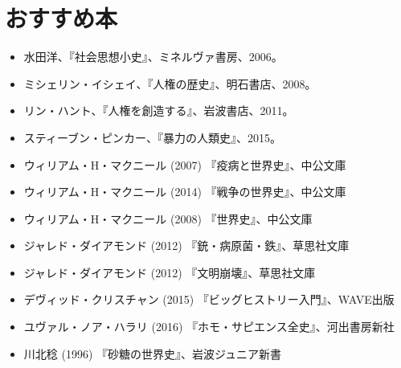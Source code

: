 \documentclass[autodetect-engine,dvipdfmx-if-dvi,ja=standard]{bxjsarticle} \usepackage{mystyle}
\begin{document}
\section*{おすすめ本}
\begin{itemize}
\item 水田洋、『社会思想小史』、ミネルヴァ書房、2006。
\item ミシェリン・イシェイ、『人権の歴史』、明石書店、2008。
\item リン・ハント、『人権を創造する』、岩波書店、2011。
\item スティーブン・ピンカー、『暴力の人類史』、2015。
\item ウィリアム・H・マクニール (2007) 『疫病と世界史』、中公文庫
\item ウィリアム・H・マクニール (2014) 『戦争の世界史』、中公文庫
\item   ウィリアム・H・マクニール (2008) 『世界史』、中公文庫
\item ジャレド・ダイアモンド (2012) 『銃・病原菌・鉄』、草思社文庫
\item ジャレド・ダイアモンド (2012) 『文明崩壊』、草思社文庫
\item デヴィッド・クリスチャン (2015) 『ビッグヒストリー入門』、WAVE出版
\item ユヴァル・ノア・ハラリ (2016) 『ホモ・サピエンス全史』、河出書房新社
\item 川北稔 (1996) 『砂糖の世界史』、岩波ジュニア新書

  
  
\end{itemize}


\nocite{Pinker11:angel}
\nocite{hunt07:_inven_human_right}
\nocite{水田洋06:社会思想小史}
\nocite{ishay04:_histor_human_right}





\ifx\mybook\undefined

%
\end{document}
